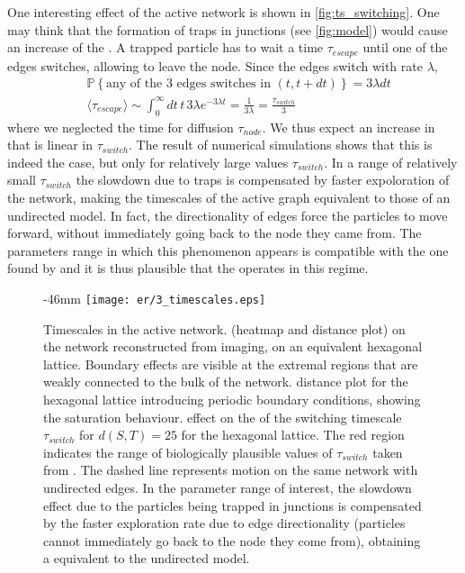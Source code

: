 One interesting effect of the active network is shown in \cref{fig:ts_switching}. One may think that the formation of traps in junctions (see \cref{fig:model}) would cause an increase of the . A trapped particle has to wait a time $\tau_{escape}$ until one of the edges switches, allowing to leave the node. Since the edges switch with rate $\lambda$,
\begin{align}
  &\mathbb{P}\left\{ \text{any of the 3 edges switches in }(t, t + dt)\right\} = 3\lambda dt\\
  &\langle \tau_{escape}\rangle \sim \int_{0}^{\infty} dt \,t\,3\lambda e^{-3\lambda t} = \frac{1}{3\lambda} = \frac{\tau_{switch}}{3}
\end{align}
where we neglected the time for diffusion $\tau_{node}$. We thus expect an increase in  that is linear in $\tau_{switch}$. The result of numerical simulations shows that this is indeed the case, but only for relatively large values $\tau_{switch}$. In a range of relatively small $\tau_{switch}$ the slowdown due to traps is compensated by faster expoloration of the network, making the timescales of the active graph equivalent to those of an undirected model. In fact, the directionality of edges force the particles to move forward, without immediately going back to the node they came from. The parameters range in which this phenomenon appears is compatible with the one found by \cite{holcman2018single} and it is thus plausible that the  operates in this regime.

\begin{figure}
  \begin{adjustwidth*}{}{-46mm}
    \texttt{[image: er/3\_timescales.eps]}%
    {{\label{fig:ts_er}}%
    {\label{fig:ts_hex}}%
    {\label{fig:ts_hex_pbc}}%
    {\label{fig:ts_switching}}}%
    \caption{Timescales in the active network.
    \enspace {} (heatmap and distance plot) on the network reconstructed from  imaging, \enspace {} on an equivalent hexagonal lattice. Boundary effects are visible at the extremal regions that are weakly connected to the bulk of the network.   distance plot for the hexagonal lattice introducing periodic boundary conditions, showing the saturation behaviour.
    \enspace effect on the  of the switching timescale $\tau_{switch}$ for $d(S, T) = 25$ for the hexagonal lattice. The red region indicates the range of biologically plausible values of $\tau_{switch}$ taken from \cite{holcman2018single}. The dashed line represents motion on the same network with undirected edges. In the parameter range of interest, the slowdown effect due to the particles being trapped in junctions is compensated by the faster exploration rate due to edge directionality (particles cannot immediately go back to the node they come from), obtaining a  equivalent to the undirected model.\label{fig:ts}}

  \end{adjustwidth*}
\end{figure}

